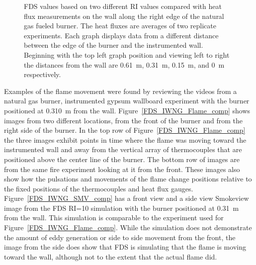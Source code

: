 \documentclass[twoside]{uocthesis}
\begin{document}
{\begin{figure}[ht!]
  \caption[FDS values based on two different RI values compared with heat flux measurements on the wall along the right edge of the natural gas fueled burner]{FDS values based on two different RI values compared with heat flux measurements on the wall along the right edge of the natural gas fueled burner. The heat fluxes are averages of two replicate experiments. Each graph displays data from a different distance between the edge of the burner and the instrumented wall.  Beginning with the top left graph position and viewing left to right the distances from the wall are 0.61~m, 0.31~m, 0.15~m, and 0~m respectively.}
  \label{FDS_HFEdge_IWNG_comp}
\end{figure}

Examples of the flame movement were found by reviewing the videos from a natural gas burner, instrumented gypsum wallboard experiment with the burner positioned at 0.310~m from the wall.  Figure~\ref{FDS_IWNG_Flame_comp} shows images from two different locations, from the front of the burner and from the right side of the burner.  In the top row of Figure~\ref{FDS_IWNG_Flame_comp} the three images exhibit points in time where the flame was moving toward the instrumented wall and away from the vertical array of thermocouples that are positioned above the center line of the burner.  The bottom row of images are from the same fire experiment looking at it from the front.  These images also show how the pulsations and movements of the flame change positions relative to the fixed positions of the thermocouples and heat flux gauges. 
Figure~\ref{FDS_IWNG_SMV_comp} has a front view and a side view Smokeview image from the FDS RI=10 simulation with the burner positioned at 0.31~m from the wall.  This simulation is comparable to the experiment used for Figure~\ref{FDS_IWNG_Flame_comp}.  While the simulation does not demonstrate the amount of eddy generation or side to side movement from the front, the image from the side does show that FDS is simulating that the flame is moving toward the wall, although not to the extent that the actual flame did. 

}
\end{document}
